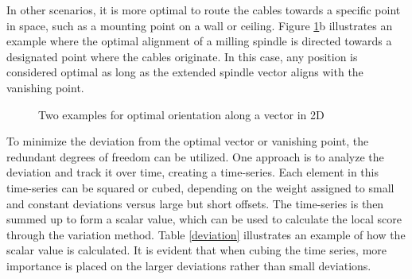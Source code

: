 In other scenarios, it is more optimal to route the cables towards a specific point in space, such as a mounting point on a wall or ceiling. Figure \ref{OOPti}b illustrates an example where the optimal alignment of a milling spindle is directed towards a designated point where the cables originate. In this case, any position is considered optimal as long as the extended spindle vector aligns with the vanishing point.


\begin{figure}[H]%
	\centering
	\qquad
	\caption{Two examples for optimal orientation along a vector in 2D}%
	\label{OOPti}%
\end{figure}



To minimize the deviation from the optimal vector or vanishing point, the redundant degrees of freedom can be utilized. One approach is to analyze the deviation and track it over time, creating a time-series. Each element in this time-series can be squared or cubed, depending on the weight assigned to small and constant deviations versus large but short offsets. The time-series is then summed up to form a scalar value, which can be used to calculate the local score through the variation method. Table \ref{deviation} illustrates an example of how the scalar value is calculated. It is evident that when cubing the time series, more importance is placed on the larger deviations rather than small deviations.


